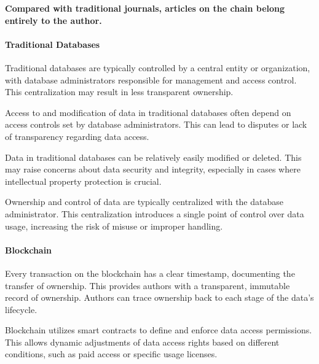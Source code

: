 \documentclass[lettersize,journal]{IEEEtran}
\begin{document}
\textbf{Compared with traditional journals, articles on the chain belong entirely to the author.}


\paragraph{Traditional Databases}

Traditional databases are typically controlled by a central entity or organization, with database administrators responsible for management and access control. This centralization may result in less transparent ownership.

Access to and modification of data in traditional databases often depend on access controls set by database administrators. This can lead to disputes or lack of transparency regarding data access.

Data in traditional databases can be relatively easily modified or deleted. This may raise concerns about data security and integrity, especially in cases where intellectual property protection is crucial.

Ownership and control of data are typically centralized with the database administrator. This centralization introduces a single point of control over data usage, increasing the risk of misuse or improper handling.

\paragraph{Blockchain}

Every transaction on the blockchain has a clear timestamp, documenting the transfer of ownership. This provides authors with a transparent, immutable record of ownership. Authors can trace ownership back to each stage of the data's lifecycle.

Blockchain utilizes smart contracts to define and enforce data access permissions. This allows dynamic adjustments of data access rights based on different conditions, such as paid access or specific usage licenses.
\end{document}
